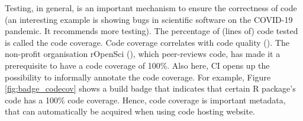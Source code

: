 Testing, in general, is an important mechanism to ensure
the correctness of code (an interesting example is \cite{rahman2020exploratory}
showing bugs in scientific software on the COVID-19 pandemic. 
It recommends more testing).
The percentage of (lines of) code tested is called the code coverage.
Code coverage correlates with code quality (\cite{horgan1994,del1995correlation}). 
The non-profit organisation rOpenSci (\cite{ram2018community}),
which peer-reviews code,
has made it a prerequisite to have a code coverage of 100\%.
Also here, CI opens up the possibility to informally annotate the
code coverage. For example, Figure \ref{fig:badge_codecov} shows a 
build badge that indicates that certain R package's code 
has a 100\% code coverage.
Hence, code coverage is important metadata, that can automatically
be acquired when using code hosting website.

